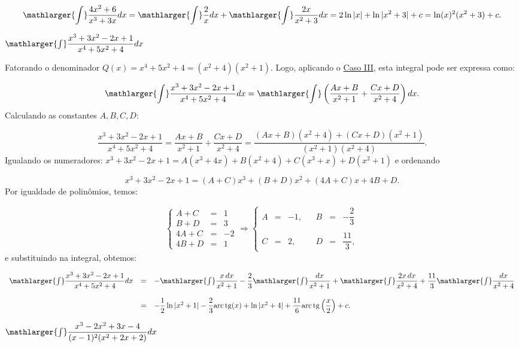 \cleardoublepage\documentclass[../main.tex]{subfiles}
\begin{document}
\begin{exeresol}
\begin{compactenum}[a)]
\begin{solution}
\[ \mathlarger{\int}\dfrac{4x^2+6}{x^3+3x}dx =\mathlarger{\int}\dfrac{2}{x}dx +\mathlarger{\int}\dfrac{2x}{x^2+3} dx = 2\ln|x|+\ln|x^2+3|+c= \ln (x)^2(x^2+3)+c. \]

\end{solution}
\item \(\mathlarger{\int}\dfrac{x^3+3x^2-2x+1}{x^4+5x^2+4} dx\)

\begin{solution}
Fatorando o denominador \(Q(x)=x^4+5x^2+4=(x^2+4)(x^2+1)\). Logo, aplicando o \hyperlink{FracParcCasoIII}{Caso III}, esta integral pode ser expressa como:

\[ \mathlarger{\int}\dfrac{x^3+3x^2-2x+1}{x^4+5x^2+4} dx =\mathlarger{\int}\left(\dfrac{Ax+B}{x^2+1}+ \dfrac{Cx+D}{x^2+4}\right) dx. \]
Calculando as constantes \(A,B,C, D\):

\[ \dfrac{x^3+3x^2-2x+1}{x^4+5x^2+4}= \dfrac{Ax+B}{x^2+1}+ \dfrac{Cx+D}{x^2+4} = \dfrac{(Ax+B)(x^2+4) +(Cx+D)(x^2 +1)}{(x^2+1)(x^2+4)}. \]
Igualando os numeradores: \(x^3+3x^2-2x+1 = A(x^3+4x)+B(x^2+4) +C(x^3+x)+D(x^2+1)\) e ordenando

\[ x^3+3x^2-2x+1=(A+C)x^3 +(B+D)x^2 +(4A+C)x +4B+D. \]
Por igualdade de polinômios, temos:

\[ \left\{ \begin{array}{rcr} A+C &=&1\\ B+D &=&3\\ 4A+C&=&-2\\ 4B+D&=&1 \end{array} \right. \Rightarrow \left\{ \begin{array}{ccrcccr} A&=&-1,& & B&=&-\dfrac{2}{3}\\ &&&&&\\ C&=&2,& & D&=&\dfrac{11}{3}, \end{array} \right. \]
e substituindo na integral, obtemos:

\[ \begin{array}{rcl} \mathlarger{\int}\dfrac{x^3+3x^2-2x+1}{x^4+5x^2+4} dx &=&-\mathlarger{\int}\dfrac{x\,dx}{x^2+1} - \dfrac{2}{3}\mathlarger{\int}\dfrac{dx}{x^2+1} +\mathlarger{\int}\dfrac{2x\,dx}{x^2+4} + \dfrac{11}{3}\mathlarger{\int}\dfrac{dx}{x^2+4}\\ \\ &=& -\dfrac{1}{2}\ln|x^2+1|-\dfrac{2}{3}{\rm arc\,tg} (x) +\ln|x^2+4|+\dfrac{11}{6}{\rm arc\,tg}\left( \dfrac{x}{2}\right)+c. \end{array} \]
\end{solution}
\item \(\mathlarger{\int}\dfrac{x^3-2x^2+3x-4}{(x-1)^2(x^2+2x+2)} dx\)


\end{compactenum}
\end{exeresol}
\end{document}
